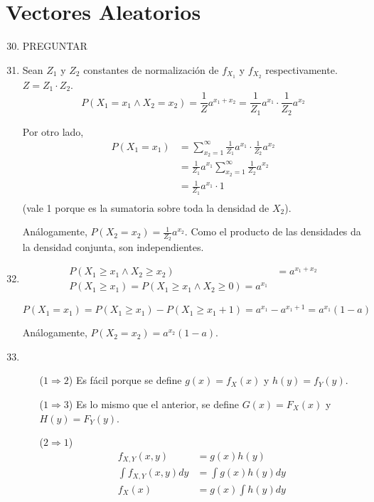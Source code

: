 \section{Vectores Aleatorios}
\begin{enumerate}
	\setcounter{enumi}{29}
	\item
		PREGUNTAR
	\item
		Sean $Z_1$ y $Z_2$ constantes de normalización de $f_{X_1}$ y $f_{X_2}$ respectivamente. $Z = Z_1\cdot Z_2$.
		$$P(X_1 = x_1 \land X_2 = x_2) = \frac{1}{Z}a^{x_1+x_2} = \frac{1}{Z_1}a^{x_1}\cdot \frac{1}{Z_2}a^{x_2}$$
		
		Por otro lado,
		\begin{align*}
			P(X_1 = x_1) & = \sum_{x_2 = 1}^{\infty} \frac{1}{Z_1}a^{x_1}\cdot \frac{1}{Z_2}a^{x_2} \\
			             & = \frac{1}{Z_1}a^{x_1} \sum_{x_2 = 1}^{\infty} \frac{1}{Z_2}a^{x_2} \\
			             & = \frac{1}{Z_1}a^{x_1} \cdot 1 \\
		\end{align*}
		(vale 1 porque es la sumatoria sobre toda la densidad de $X_2$).
		
		Análogamente, $P(X_2 = x_2) = \frac{1}{Z_2}a^{x_2}$. Como el producto de las densidades da la densidad conjunta, son independientes.
		
	\item
		\begin{align*}
			P(X_1 \geq x_1 \land X_2 \geq x_2)	& = a^{x_1 + x_2}			\\
			P(X_1 \geq x_1) = P(X_1 \geq x_1 \land X_2 \geq 0) = a^{x_1}
		\end{align*}
		
		$$P(X_1 = x_1) = P(X_1 \geq x_1) - P(X_1\geq x_1+1) = a^{x_1} - a^{x_1+1} = a^{x_1}(1-a)$$
		
		Análogamente, $P(X_2 = x_2) = a^{x_2}(1-a)$.
		
	\item \hfill 
		\begin{itemize}				
			\item[($1\Rightarrow 2$)]
				Es fácil porque se define $g(x) = f_X(x)$ y $h(y) = f_Y(y)$.
			
			\item[($1\Rightarrow 3$)]
				Es lo mismo que el anterior, se define $G(x) = F_X(x)$ y $H(y) = F_Y(y)$.
				
			\item[($2\Rightarrow 1$)]
				\begin{align*}				
					f_{X,Y}(x,y)		& = g(x)h(y)			\\
					\int f_{X,Y}(x,y)dy	& = \int g(x)h(y) dy	\\
					f_X(x)				& = g(x) \int h(y) dy
				\end{align*}
				

\end{itemize}
\end{enumerate}
